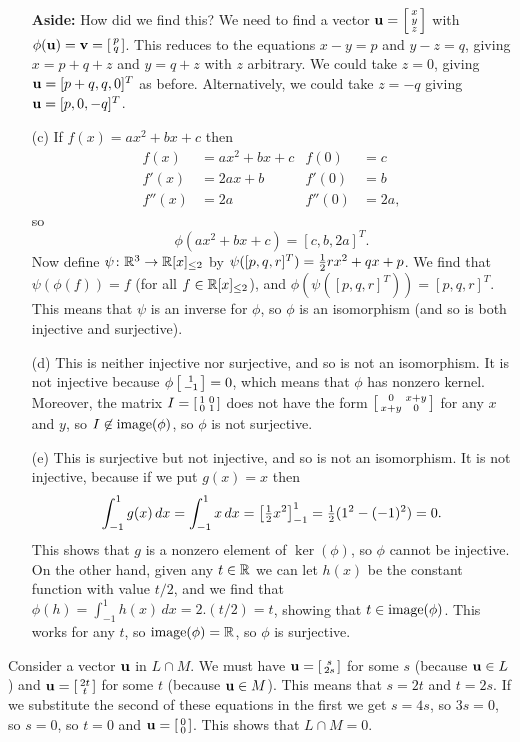 \begin{itemize}
   \textbf{Aside:} How did we find this?  We need to find a vector
   $\mathbf{u}=\left[\begin{smallmatrix} x\\ y\\ z\end{smallmatrix}\right]$ with $\phi(\mathbf{u})=\mathbf{v}=\left[\begin{smallmatrix} p\\ q\end{smallmatrix}\right]$.  This
   reduces to the equations $x-y=p$ and $y-z=q$, giving $x=p+q+z$ and
   $y=q+z$ with $z$ arbitrary.  We could take $z=0$, giving
   $\mathbf{u}=[p+q,q,0]^T$ as before.  Alternatively, we could take $z=-q$
   giving $\mathbf{u}=[p,0,-q]^T$.
  \item[(c)] If $f(x)=ax^2+bx+c$ then
   \begin{align*}
    f(x)   &= ax^2 + bx + c & f(0)   &= c \\
    f'(x)  &= 2ax + b       & f'(0)  &= b \\
    f''(x) &= 2a            & f''(0) &= 2a,
   \end{align*}
   so
   \[ \phi(ax^2+bx+c) = [c,b,2a]^T. \]
   Now define $\psi\colon{\mathbb{R}}^3\to{\mathbb{R}}[x]_{\leq 2}$ by
   $\psi([p,q,r]^T)={\textstyle\frac{1}{2}} r x^2+qx+p$.  We find that
   $\psi(\phi(f))=f$ (for all $f\in{\mathbb{R}}[x]_{\leq 2}$), and
   $\phi(\psi([p,q,r]^T))=[p,q,r]^T$.  This means that
   $\psi$ is an inverse for $\phi$, so $\phi$ is an
   isomorphism (and so is both injective and surjective).
  \item[(d)] This is neither injective nor surjective, and
   so is not an isomorphism.  It is not injective because
   $\phi\left[\begin{smallmatrix} 1\\-1\end{smallmatrix}\right]=0$, which means that $\phi$ has
   nonzero kernel.  Moreover, the matrix $I=\left[\begin{smallmatrix}
   1&0\\0&1\end{smallmatrix}\right]$ does not have the form
   $\left[\begin{smallmatrix} 0&x+y\\ x+y&0\end{smallmatrix}\right]$ for any $x$ and $y$, so
   $I\not\in\operatorname{image}(\phi)$, so $\phi$ is not surjective.
  \item[(e)] This is surjective but not injective, and so is
   not an isomorphism.  It is not injective, because if we
   put $g(x)=x$ then
   \[ \int_{-1}^1 g(x)\,dx=\int_{-1}^1 x\,dx=
       \left[ {\textstyle\frac{1}{2}} x^2 \right]_{-1}^1 =
        {\textstyle\frac{1}{2}}(1^2 - (-1)^2) = 0.
   \]
   This shows that $g$ is a nonzero element of $\ker(\phi)$,
   so $\phi$ cannot be injective.  On the other hand, given
   any $t\in{\mathbb{R}}$ we can let $h(x)$ be the constant function
   with value $t/2$, and we find that
   $\phi(h)=\int_{-1}^1h(x)\,dx=2.(t/2)=t$, showing that
   $t\in\operatorname{image}(\phi)$.  This works for any $t$, so
   $\operatorname{image}(\phi)={\mathbb{R}}$, so $\phi$ is surjective.
 \end{itemize}
\EndDeferredSolution

 Consider a vector $\mathbf{u}$ in $L\cap M$.  We
 must have $\mathbf{u}=\left[\begin{smallmatrix} s\\2s\end{smallmatrix}\right]$ for some $s$ (because
 $\mathbf{u}\in L$) and $\mathbf{u}=\left[\begin{smallmatrix} 2t\\ t\end{smallmatrix}\right]$ for some $t$ (because
 $\mathbf{u}\in M$).  This means that $s=2t$ and $t=2s$.  If we
 substitute the second of these equations in the first we
 get $s=4s$, so $3s=0$, so $s=0$, so $t=0$ and
 $\mathbf{u}=\left[\begin{smallmatrix} 0\\0\end{smallmatrix}\right]$.  This shows that $L\cap M=0$.

